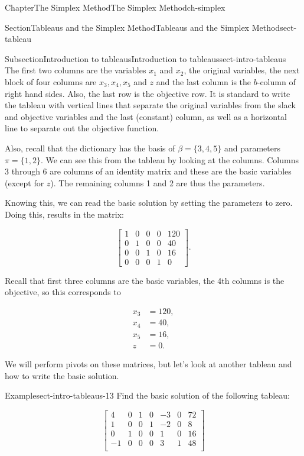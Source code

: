 \documentclass[oneside,10pt,]{book}
\numberwithin{equation}{section}
\newcommand{\amp}{&}
\begin{document}
\begin{chapterptx}{Chapter}{The Simplex Method}{}{The Simplex Method}{}{}{ch-simplex}
\begin{sectionptx}{Section}{Tableaus and the Simplex Method}{}{Tableaus and the Simplex Method}{}{}{sect-tableau}
\begin{subsectionptx}{Subsection}{Introduction to tableaus}{}{Introduction to tableaus}{}{}{sect-intro-tableaus}
The first two columns are the variables \(x_1\) and \(x_2\), the original variables, the next block of four columns are \(x_3, x_4, x_5\) and \(z\) and the last column is the \(b\)-column of right hand sides. Also, the last row is the objective row. It is standard to write the tableau with vertical lines that separate the original variables from the slack and objective variables and the last (constant) column, as well as a horizontal line to separate out the objective function.%
\par
Also, recall that the dictionary has the basis of \(\beta = \{3, 4, 5\}\) and parameters \(\pi = \{1,2\}\). We can see this from the tableau by looking at the columns. Columns 3 through 6 are columns of an identity matrix and these are the basic variables (except for \(z\)). The remaining columns 1 and 2 are thus the parameters.%
\par
Knowing this, we can read the basic solution by setting the parameters to zero. Doing this, results in the matrix:%
\par
%
\begin{equation*}
\left[ \begin{array}{rrrr|r} 1 \amp 0 \amp 0 \amp 0 \amp 120 \\ 0 \amp 1 \amp 0 \amp 0 \amp 40 \\ 0 \amp 0 \amp 1 \amp 0 \amp 16 \\ \hline 0 \amp 0 \amp 0 \amp 1 \amp 0 \end{array} \right].
\end{equation*}
%
\par
Recall that first three columns are the basic variables, the 4th columns is the objective, so this corresponds to%
\par
%
\begin{align*}
x_3 \amp =120,\\
x_4 \amp =40,\\
x_5 \amp =16,\\
z \amp =0.
\end{align*}
%
\par
We will perform pivots on these matrices, but let's look at another tableau and how to write the basic solution.%
\begin{example}{Example}{}{sect-intro-tableaus-13}%
Find the basic solution of the following tableau:%
\par
%
\begin{equation*}
\left[\begin{array}{rr|rrrr|r} 4 \amp 0 \amp 1 \amp 0 \amp -3 \amp 0 \amp 72\\ 1 \amp 0 \amp 0 \amp 1 \amp -2 \amp 0 \amp 8\\ 0 \amp 1 \amp 0 \amp 0 \amp 1 \amp 0 \amp 16\\ \hline -1 \amp 0 \amp 0 \amp 0 \amp 3 \amp 1 \amp 48\\ \end{array} \right]

\end{equation*}
\end{example}
\end{subsectionptx}
\end{sectionptx}
\end{chapterptx}
\end{document}
